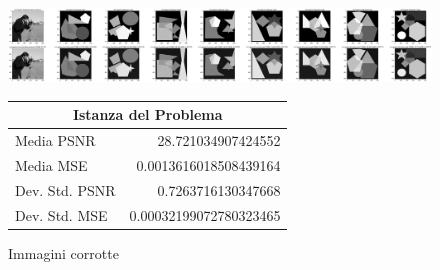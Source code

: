 \begin{figure}[H]
    \centering
    \begin{minipage}[h]{0.5\textwidth}
    \includegraphics[width=\linewidth]{output/tabCorrotte/imgcorr0.png}\label{fig:imgcorrotteGEN}
    \end{minipage}%
    \begin{minipage}[h]{0.5\textwidth}
        \centering
        \begin{tabular}{|lr|}
            \hline
            \multicolumn{2}{|c|}{\textbf{Istanza del Problema}} \\ \hline
            Media PSNR           & 28.721034907424552           \\
            Media MSE            & 0.0013616018508439164        \\
            Dev. Std. PSNR       & 0.7263716130347668           \\
            Dev. Std. MSE        & 0.00032199072780323465       \\ \hline
            \end{tabular}
    \end{minipage}
    \captionsetup{labelformat=andtable}
    \caption{Immagini corrotte}
\end{figure}
